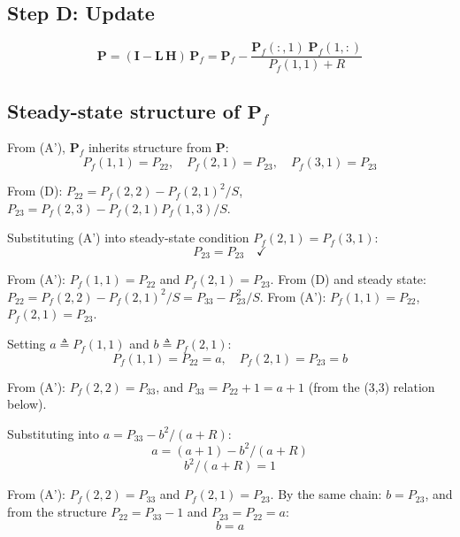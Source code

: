 \documentclass[11pt]{article}
\newcommand{\Hm}{\mathbf{H}}
\newcommand{\Pf}{\mathbf{P}_f}
\newcommand{\Pm}{\mathbf{P}}
\newcommand{\Lm}{\mathbf{L}}
\newcommand{\I}{\mathbf{I}}
\begin{document}
\subsection*{Step D: Update}
\begin{equation}
\Pm = (\I - \Lm\,\Hm)\,\Pf = \Pf - \frac{\Pf(:,1)\;\Pf(1,:)}{P_f(1,1)+R} \tag{D}
\end{equation}

\subsection*{Steady-state structure of $\Pf$}

From (A'), $\Pf$ inherits structure from $\Pm$:
\begin{equation}
P_f(1,1) = P_{22}, \quad P_f(2,1) = P_{23}, \quad P_f(3,1) = P_{23}
\end{equation}

From (D): $P_{22} = P_f(2,2) - P_f(2,1)^2/S$, $P_{23} = P_f(2,3) - P_f(2,1) P_f(1,3)/S$.

Substituting (A') into steady-state condition $P_f(2,1) = P_f(3,1)$:
\begin{equation}
P_{23} = P_{23} \quad \checkmark
\end{equation}

From (A'): $P_f(1,1) = P_{22}$ and $P_f(2,1) = P_{23}$.
From (D) and steady state: $P_{22} = P_f(2,2) - P_f(2,1)^2/S = P_{33} - P_{23}^2/S$.
From (A'): $P_f(1,1) = P_{22}$, $P_f(2,1) = P_{23}$.

Setting $a \triangleq P_f(1,1)$ and $b \triangleq P_f(2,1)$:
\begin{equation}
P_f(1,1) = P_{22} = a, \quad P_f(2,1) = P_{23} = b
\end{equation}

From (A'): $P_f(2,2) = P_{33}$, and $P_{33} = P_{22} + 1 = a + 1$ (from the (3,3) relation below).

Substituting into $a = P_{33} - b^2/(a+R)$:
\begin{equation}
a = (a+1) - b^2/(a+R)
\end{equation}
\begin{equation}
b^2/(a+R) = 1 \tag{*}
\end{equation}

From (A'): $P_f(2,2) = P_{33}$ and $P_f(2,1) = P_{23}$.
By the same chain: $b = P_{23}$, and from the structure $P_{22} = P_{33} - 1$ and $P_{23} = P_{22} = a$:
\begin{equation}
\boxed{b = a}
\end{equation}
\end{document}

